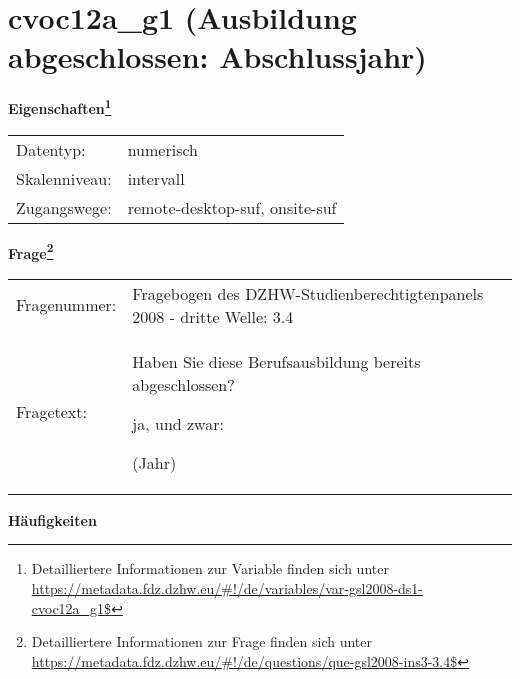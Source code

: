 
    \setcounter{footnote}{0}

    \vspace*{-1.8cm}
	\section{cvoc12a\_g1 (Ausbildung abgeschlossen: Abschlussjahr)}
	\label{section:cvoc12a_g1}



    \vspace*{0.5cm}
    \noindent\textbf{Eigenschaften\footnote{Detailliertere Informationen zur Variable finden sich unter
		\url{https://metadata.fdz.dzhw.eu/\#!/de/variables/var-gsl2008-ds1-cvoc12a_g1$}}}\\
	\begin{tabularx}{\hsize}{@{}lX}
	Datentyp: & numerisch \\
	Skalenniveau: & intervall \\
	Zugangswege: &
	  remote-desktop-suf, 
	  onsite-suf
 \\
    \end{tabularx}



				\vspace*{0.5cm}
                \noindent\textbf{Frage\footnote{Detailliertere Informationen zur Frage finden sich unter
		              \url{https://metadata.fdz.dzhw.eu/\#!/de/questions/que-gsl2008-ins3-3.4$}}}\\
				\begin{tabularx}{\hsize}{@{}lX}
					Fragenummer: &
					  Fragebogen des DZHW-Studienberechtigtenpanels 2008 - dritte Welle:
					  3.4
 \\
					Fragetext: & Haben Sie diese Berufsausbildung bereits abgeschlossen?\par  ja, und zwar:\par  (Jahr) \\
				\end{tabularx}





        		\vspace*{0.5cm}
                \noindent\textbf{Häufigkeiten}

